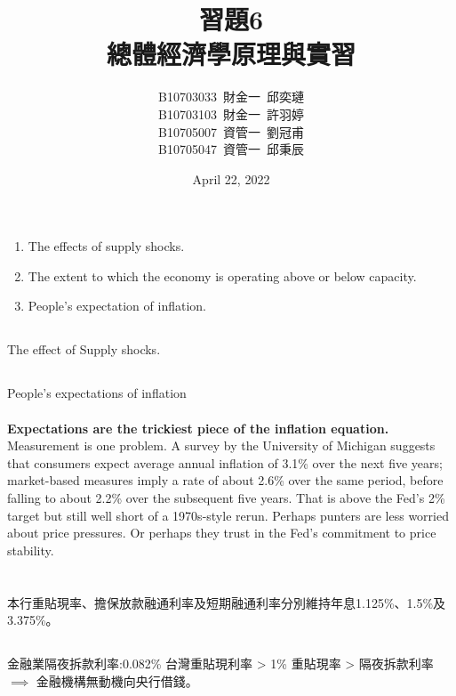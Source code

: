 \documentclass[11pt]{article}
\title{習題6 \\\Large 總體經濟學原理與實習}
\author{B10703033\ 財金一\ 邱奕璉
\\ B10703103\ 財金一\ 許羽婷
\\ B10705007\ 資管一\ 劉冠甫
\\ B10705047\ 資管一\ 邱秉辰}
\date{April 22, 2022}
\begin{document}
\maketitle

\section{}
\subsection{}
\begin{enumerate}
    \item The effects of supply shocks.
    \item The extent to which the economy is operating above or below capacity.
    \item People’s expectation of inflation.
\end{enumerate}
\subsection{}
The effect of Supply shocks.
\subsection{}
People’s expectations of inflation \\ \\
\textbf{Expectations are the trickiest piece of the inflation equation.} Measurement is one problem. A survey by the University of Michigan suggests that consumers expect average annual inflation of 3.1\% over the next five years; market-based measures imply a rate of about 2.6\% over the same period, before falling to about 2.2\% over the subsequent five years. That is above the Fed’s 2\% target but still well short of a 1970s-style rerun. Perhaps punters are less worried about price pressures. Or perhaps they trust in the Fed’s commitment to price stability.
\section{}
\subsection{}
本行重貼現率、擔保放款融通利率及短期融通利率分別維持年息1.125\%、1.5\%及3.375\%。
\subsection{}
金融業隔夜拆款利率:0.082\%
台灣重貼現利率 > 1\%
重貼現率 > 隔夜拆款利率 $\implies$ 金融機構無動機向央行借錢。
\end{document}
